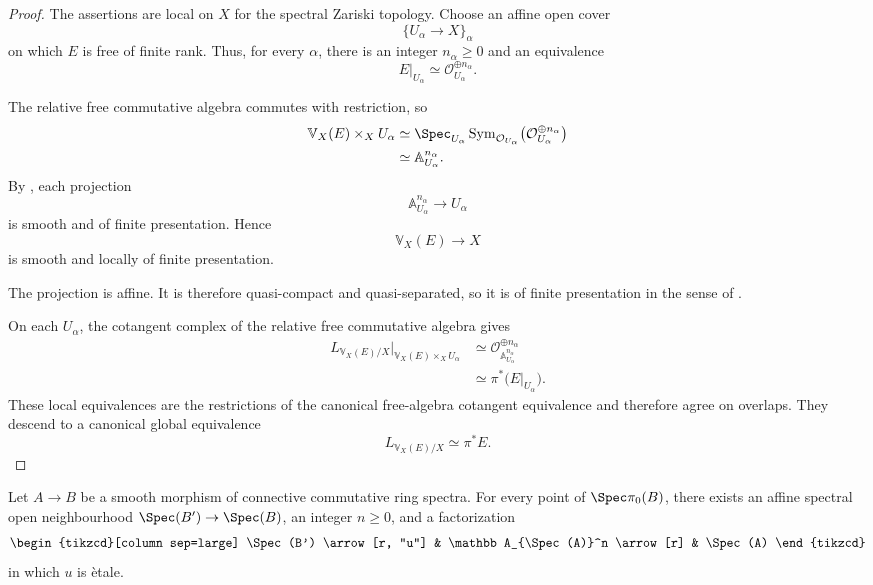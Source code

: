 \begin{proof}
The assertions are local on \(X\) for the spectral Zariski topology.
Choose an affine open cover
\[
    \{U_\alpha\to X\}_\alpha
\]
on which \(E\) is free of finite rank. Thus, for every \(\alpha\), there
is an integer \(n_\alpha\geq0\) and an equivalence
\[
    E|_{U_\alpha}
    \simeq
    \mathcal O_{U_\alpha}^{\oplus n_\alpha}.
\]

The relative free commutative algebra commutes with restriction, so
\[
\begin{aligned}
    \mathbb V_X(E)\times_XU_\alpha
    &\simeq
    \Spec_{U_\alpha}
    \operatorname{Sym}_{\mathcal O_{U_\alpha}}
    \bigl(
        \mathcal O_{U_\alpha}^{\oplus n_\alpha}
    \bigr)
    \\
    &\simeq
    \mathbb A^{n_\alpha}_{U_\alpha}.
\end{aligned}
\]
By
,
each projection
\[
    \mathbb A^{n_\alpha}_{U_\alpha}
    \longrightarrow
    U_\alpha
\]
is smooth and of finite presentation. Hence
\[
    \mathbb V_X(E)
    \longrightarrow
    X
\]
is smooth and locally of finite presentation.

The projection is affine. It is therefore quasi-compact and
quasi-separated, so it is of finite presentation in the sense of
.

On each \(U_\alpha\), the cotangent complex of the relative free
commutative algebra gives
\[
\begin{aligned}
    L_{\mathbb V_X(E)/X}
    \big|_{\mathbb V_X(E)\times_XU_\alpha}
    &\simeq
    \mathcal O_{\mathbb A^{n_\alpha}_{U_\alpha}}^{\oplus n_\alpha}
    \\
    &\simeq
    \pi^*
    \bigl(
        E|_{U_\alpha}
    \bigr).
\end{aligned}
\]
These local equivalences are the restrictions of the canonical
free-algebra cotangent equivalence and therefore agree on overlaps.
They descend to a canonical global equivalence
\[
    L_{\mathbb V_X(E)/X}
    \simeq
    \pi^*E.
\]
\end{proof}

\begin{theorem}
\label{thm:smooth-local-standard-form}
Let $A\to B$ be a smooth morphism of connective commutative ring spectra.
For every point of $\Spec\pi_0(B)$, there exists an affine spectral open
neighbourhood $\Spec(B')\to\Spec(B)$, an integer $n\geq0$, and a
factorization
\[
\begin{tikzcd}[column sep=large]
    \Spec(B')
        \arrow[r, "u"]
    &
    \mathbb A_{\Spec(A)}^n
        \arrow[r]
    &
    \Spec(A)
\end{tikzcd}
\]
in which $u$ is \`etale.
\end{theorem}

